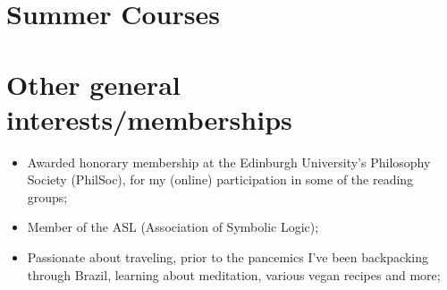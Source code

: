\documentclass[11pt,a4paper,sans]{moderncv}        %
\begin{document}
\section{Summer Courses}

\section{Other general interests/memberships}
\begin{itemize}
\item Awarded honorary membership at the Edinburgh University's Philosophy Society (PhilSoc), for
  my (online) participation in some of the reading groups;
\item Member of the ASL (Association of Symbolic Logic);
\item Passionate about traveling, prior to the pancemics I've been backpacking
  through Brazil, learning about meditation, various vegan recipes and more;
\end{itemize}





\end{document}
